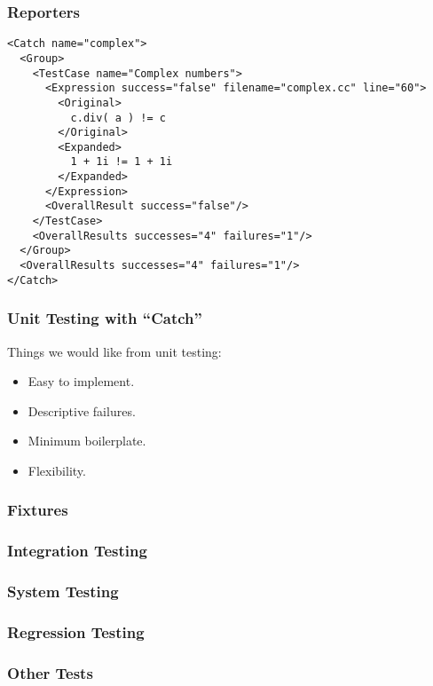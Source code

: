 \begin{frame}[fragile]
  \frametitle{Reporters}
  \footnotesize
  \begin{verbatim}
<Catch name="complex">
  <Group>
    <TestCase name="Complex numbers">
      <Expression success="false" filename="complex.cc" line="60">
        <Original>
          c.div( a ) != c
        </Original>
        <Expanded>
          1 + 1i != 1 + 1i
        </Expanded>
      </Expression>
      <OverallResult success="false"/>
    </TestCase>
    <OverallResults successes="4" failures="1"/>
  </Group>
  <OverallResults successes="4" failures="1"/>
</Catch>
  \end{verbatim}
\end{frame}

\begin{frame}[fragile]
  \frametitle{Unit Testing with ``Catch''}
  Things we would like from unit testing:
  \begin{itemize}
  \vspace{0.5cm}
  \item Easy to implement.
  \vspace{0.5cm}
  \item Descriptive failures.
  \vspace{0.5cm}
  \item Minimum boilerplate.
  \vspace{0.5cm}
  \item Flexibility.
  \end{itemize}
\end{frame}

\begin{frame}
  \frametitle{Fixtures}
\end{frame}

\begin{frame}
  \frametitle{Integration Testing}
\end{frame}

\begin{frame}
  \frametitle{System Testing}
\end{frame}

\begin{frame}
  \frametitle{Regression Testing}
\end{frame}

\begin{frame}
  \frametitle{Other Tests}
\end{frame}
